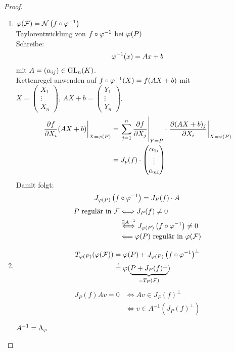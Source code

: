 \documentclass[parskip,a4paper,twoside,DIV15,BCOR12mm]{scrbook}
\begin{document}
\begin{proof}
\begin{enumerate}
\item \(\varphi(\mathcal{F})=\mathcal{N}\left(f\circ\varphi^{-1}\right)\)\\
Taylorentwicklung von \(f\circ\varphi^{-1}\) bei \(\varphi(P)\)\\
Schreibe:
\[
\varphi^{-1}(x)=Ax+b
\]
mit \(A=(\alpha_{ij})\in\operatorname{GL}_{n}(K)\).\\
Kettenregel anwenden auf \(f\circ\varphi^{-1}(X)=f(AX+b)\) mit\break 
\(X=\begin{pmatrix}X_{1}\\\vdots\\X_{n}\end{pmatrix},\,
    AX+b=\begin{pmatrix}Y_{1}\\\vdots\\Y_{n}\end{pmatrix}\).
\begin{align*}
\left.\frac{\partial f}{\partial X_{i}}(AX+b)\right|_{X=\varphi(P)}&=
    \left.\sum_{j=1}^{n}{\frac{\partial f}{\partial X_{j}}}\right|_{Y=P}\cdot
    \left.\frac{\partial(AX+b)_{j}}{\partial X_{i}}\right|_{X=\varphi(P)}\\
&=J_{p}(f)\cdot\begin{pmatrix}\alpha_{1i}\\\vdots\\\alpha_{ni}\end{pmatrix}\\
\end{align*}
Damit folgt: 
\[
J_{\varphi(P)}\left(f\circ\varphi^{-1}\right)=J_{P}(f)\cdot A
\]
\begin{align*}
P\text{ regulär in }\mathcal{F}&\Longleftrightarrow J_{P}(f)\neq0\\
&\overset{\exists A^{-1}}{\Longleftrightarrow}J_{\varphi(P)}\left(f\circ\varphi^{-1}\right)\neq0\\
&\Longleftarrow\varphi(P)\text{ regulär in }\varphi(\mathcal{F})
\end{align*}
\item\begin{align*}
T_{\varphi(P)}(\varphi(\mathcal{F}))&=\varphi(P)+J_{\varphi(P)}\left(f\circ\varphi^{-1}\right)^{\bot}\\
&\overset{!}{=}\varphi(\underbrace{P+J_{P}(f)^{\bot}}_{=T_{P}(\mathcal{F})})
\end{align*}
\begin{align*}
J_{P}(f)Av=0&\Longleftrightarrow Av\in J_{P}(f)^{\bot}\\
&\Longleftrightarrow v\in A^{-1}\left(J_{P}(f)^{\bot}\right)
\end{align*}
\begin{note}
\(A^{-1}=\Lambda_{\varphi}\)
\end{note}
\end{enumerate}
\end{proof}
\end{document}
